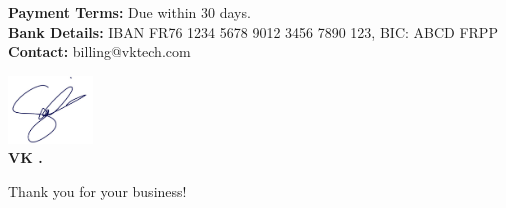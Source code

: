 \documentclass[a4paper,12pt]{article}
\begin{document}
\vspace{1cm}

\noindent
\textbf{Payment Terms:} Due within 30 days. \\
\textbf{Bank Details:} IBAN FR76 1234 5678 9012 3456 7890 123, BIC: ABCD FRPP \\
\textbf{Contact:} billing@vktech.com \\


\begin{flushright}
\hspace{2cm}
\includegraphics[height=18mm]{smartinvoice/resources/latex_resources/sample_signature.jpeg} \\
\textbf{VK   .}
\end{flushright}
\vfill
\begin{center}
    {\small Thank you for your business!}
\end{center}
\end{document}
